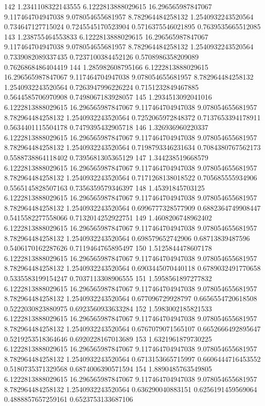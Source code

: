 {142 1.2341108322143555 6.1222813888029615 16.296565987847067 9.117464704947038 9.078054655681957 8.782964484258132 1.2540932243520564 0.734647127715024 0.7245545170523904 0.5716375546021895 0.7639535665512085
143 1.238755464553833 6.1222813888029615 16.296565987847067 9.117464704947038 9.078054655681957 8.782964484258132 1.2540932243520564 0.7339082089337435 0.7237100384452126 0.5708986358209089 0.7626868486404419
144 1.285982608795166 6.1222813888029615 16.296565987847067 9.117464704947038 9.078054655681957 8.782964484258132 1.2540932243520564 0.7263947996226224 0.7151232849467885 0.5644585706970908 0.7498067183928057
145 1.2934513092041016 6.1222813888029615 16.296565987847067 9.117464704947038 9.078054655681957 8.782964484258132 1.2540932243520564 0.7252065972848372 0.7137653394178911 0.5634401115504178 0.7479395432905718
146 1.326936960220337 6.1222813888029615 16.296565987847067 9.117464704947038 9.078054655681957 8.782964484258132 1.2540932243520564 0.7198793346231634 0.7084380767562173 0.5588738864118402 0.7395681305365129
147 1.344238519668579 6.1222813888029615 16.296565987847067 9.117464704947038 9.078054655681957 8.782964484258132 1.2540932243520564 0.7171268138018522 0.705685555934906 0.5565145828507163 0.7356359579346397
148 1.45391845703125 6.1222813888029615 16.296565987847067 9.117464704947038 9.078054655681957 8.782964484258132 1.2540932243520564 0.6996777328577909 0.6882364749908447 0.5415582277558066 0.7132014252922751
149 1.4608206748962402 6.1222813888029615 16.296565987847067 9.117464704947038 9.078054655681957 8.782964484258132 1.2540932243520564 0.698579652742906 0.68713839487596 0.5406170162287626 0.7119464765895497
150 1.5125844478607178 6.1222813888029615 16.296565987847067 9.117464704947038 9.078054655681957 8.782964484258132 1.2540932243520564 0.6903445070440118 0.6789032491770658 0.5335583199154247 0.7037113308906555
151 1.5958561897277832 6.1222813888029615 16.296565987847067 9.117464704947038 9.078054655681957 8.782964484258132 1.2540932243520564 0.677096729928797 0.6656554720618508 0.5222030823880975 0.6923560933633284
152 1.5983002185821533 6.1222813888029615 16.296565987847067 9.117464704947038 9.078054655681957 8.782964484258132 1.2540932243520564 0.6767079071565107 0.6652666492895647 0.5219253518364646 0.6920228167013689
153 1.6321961879730225 6.1222813888029615 16.296565987847067 9.117464704947038 9.078054655681957 8.782964484258132 1.2540932243520564 0.6713153665715997 0.6606444716453552 0.5180735371329568 0.6874006390571594
154 1.8890485763549805 6.1222813888029615 16.296565987847067 9.117464704947038 9.078054655681957 8.782964484258132 1.2540932243520564 0.636290040883151 0.6256191459569064 0.4888857657259161 0.6523753133687106
}
